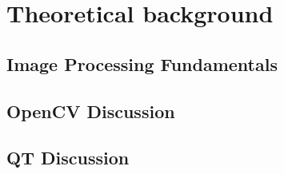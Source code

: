 \section{Theoretical background}

\subsection{Image Processing Fundamentals}

\subsection{OpenCV Discussion}

\subsection{QT Discussion}

